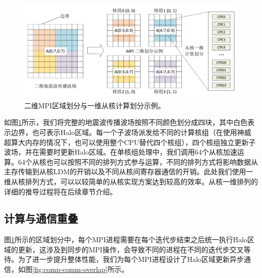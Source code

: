 \documentclass[degree=doctor]{thuthesis}
\begin{document}
\begin{figure}[th]
  \centering
  \includegraphics[width=1.0\columnwidth]{2ddecomposition.pdf}
  \caption{二维MPI区域划分与一维从核计算划分示例。}
  \label{fig:2ddecomposition}
\end{figure}

如图\ref{fig:2ddecomposition}所示，我们将完整的地震波传播波场按照不同颜色划分成四块，其中白色表示边界，也可表示Halo区域。每一个子波场派发给不同的计算核组（在使用神威超算大内存的情况下，也可以使用整个CPU替代四个核组），四个核组独立更新子波场，并在需要时更新Halo区域。在单核组处理中，我们调用64个从核加速运算。64个从核也可以按照不同的排列方式参与运算，不同的排列方式将影响数据从主存传输到从核LDM的开销以及不同从核间寄存器通信的开销。此处我们使用一维从核排列方式，可以以较简单的从核实现方案达到较高的效率。从核一维排列的详细的推导过程将在后续章节介绍。


\subsection{计算与通信重叠} %
\label{sub:计算与通信重叠}

图\ref{fig:2ddecomposition}所示的区域划分中，每个MPI进程需要在每个迭代步结束之后统一执行Halo区域的更新，这涉及到同步的MPI操作，会导致不同的进程在不同的迭代步交叉等待。为了进一步提升整体性能，我们为每个MPI进程设计了Halo区域更新异步通信，如图\ref{fig:comp-comm-overlap}所示。
\end{document}
